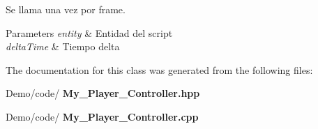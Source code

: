 Se llama una vez por frame. 


\begin{DoxyParams}{Parameters}
{\em entity} & Entidad del script \\
\hline
{\em delta\+Time} & Tiempo delta \\
\hline
\end{DoxyParams}


The documentation for this class was generated from the following files\+:\begin{DoxyCompactItemize}
\item 
Demo/code/\textbf{ My\+\_\+\+Player\+\_\+\+Controller.\+hpp}\item 
Demo/code/\textbf{ My\+\_\+\+Player\+\_\+\+Controller.\+cpp}\end{DoxyCompactItemize}
